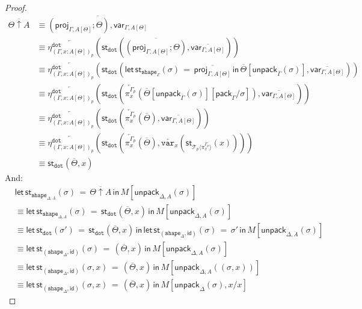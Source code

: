 \documentclass[10pt]{article}
\theoremstyle{definition}
\newcommand{\id}{\mathsf{id}}
\newcommand{\rewrite}[2]{\overleftarrow{#1}(#2)}
\newcommand\StI[2]{\ensuremath{\mathsf{st}_{#1}(#2)}}
\newcommand\StE[4]{\ensuremath{\mathsf{let} \, \StI{#1}{#3} \, = \, {#2} \, \mathsf{in} \, #4}}
\newcommand\ApEl[2]{\mathcal{T}_{#1}\langle#2\rangle}
\newcommand\pack[1]{\ensuremath{\mathsf{pack}_{#1}}}
\newcommand\unpack[2]{\ensuremath{\mathsf{unpack}_{#1}(#2)}}
\newcommand{\modeof}[1]{{#1}_p}
\newcommand{\tdot}{\ensuremath{\mathtt{dot}}}
\newcommand{\tshape}[1]{\ensuremath{\mathtt{shape}_{#1}}}
\newcommand{\upstairs}[1]{\overline{#1}}
\newcommand\proj[1]{\ensuremath{\mathsf{proj}_{#1}}}
\newcommand\qvar[1]{\ensuremath{\mathsf{var}_{#1}}}
\newcommand\var[1]{\ensuremath{\mathtt{var}_{#1}}}
\begin{document}
\begin{proof}
\begin{align*}
\upstairs{\Theta \uparrow A} 
&\equiv \upstairs{(\proj{\Gamma, A[\Theta]}; \Theta) , \qvar{\Gamma, A[\Theta]}} \\
&\equiv \rewrite{\eta^\tdot_{\modeof{(\Gamma, x : A[\Theta])}}}{\StI{\tdot}{\upstairs{(\proj{\Gamma, A[\Theta]}; \Theta)}, \upstairs{\qvar{\Gamma,A[\Theta]}}}} \\
&\equiv \rewrite{\eta^\tdot_{\modeof{(\Gamma, x : A[\Theta])}}}{\StI{\tdot}{\StE{\tshape{\Gamma}}{\upstairs{\proj{\Gamma, A[\Theta]}}}{\sigma}{\upstairs{\Theta}[\unpack{\upstairs{\Gamma}}{\sigma}]}, \upstairs{\qvar{\Gamma,A[\Theta]}}}} \\
&\equiv \rewrite{\eta^\tdot_{\modeof{(\Gamma, x : A[\Theta])}}}{\StI{\tdot}{\rewrite{\pi^{\modeof{\Gamma}}_x}{\upstairs{\Theta}[\unpack{\upstairs{\Gamma}}{\sigma}][\pack{\Gamma}/\sigma]}, \upstairs{\qvar{\Gamma,A[\Theta]}}}} \\
&\equiv \rewrite{\eta^\tdot_{\modeof{(\Gamma, x : A[\Theta])}}}{\StI{\tdot}{\rewrite{\pi^{\modeof{\Gamma}}_x}{\upstairs{\Theta}}, \upstairs{\qvar{\Gamma,A[\Theta]}}}} \\
&\equiv \rewrite{\eta^\tdot_{\modeof{(\Gamma, x : A[\Theta])}}}{\StI{\tdot}{\rewrite{\pi^{\modeof{\Gamma}}_x}{\upstairs{\Theta}},  \rewrite{\var{x}}{\StI{\ApEl{p}{\pi^{\modeof{\Gamma}}_x}}{x}}}} \\
&\equiv \StI{\tdot}{\upstairs{\Theta}, x}
\end{align*}
And:
\begin{align*}
&\StE{\tshape{\Delta, A}}{\upstairs{\Theta \uparrow A}}{\sigma}{M[\unpack{\Delta, A}{\sigma}]} \\
&\equiv \StE{\tshape{\Delta, A}}{\StI{\tdot}{\upstairs{\Theta}, x}}{\sigma}{M[\unpack{\Delta, A}{\sigma}]} \\
&\equiv \StE{\tdot}{\StI{\tdot}{\upstairs{\Theta}, x}}{\sigma'}{\StE{(\tshape{\Delta}, \id)}{\sigma'}{\sigma}{M[\unpack{\Delta, A}{\sigma}]}} \\
&\equiv \StE{(\tshape{\Delta}, \id)}{(\upstairs{\Theta}, x)}{\sigma}{M[\unpack{\Delta, A}{\sigma}]} \\
&\equiv \StE{(\tshape{\Delta}, \id)}{(\upstairs{\Theta}, x)}{\sigma, x}{M[\unpack{\Delta, A}{(\sigma, x)}]} \\
&\equiv \StE{(\tshape{\Delta}, \id)}{(\upstairs{\Theta}, x)}{\sigma, x}{M[\unpack{\Delta}{\sigma}, x/x]}
\end{align*}
\end{proof}
\end{document}
